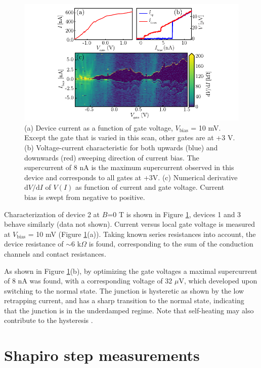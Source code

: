 \documentclass[english, aps,prb,showpacs,preprintnumber,amsmath,amssymb,superscriptaddress,reprint]{revtex4-1}
\begin{document}
\begin{figure}[!h]
\centering
\includegraphics[width=\textwidth]{figures/sup_fig1.pdf}
\caption{(a) Device current as a function of gate voltage, $V_\mathrm{bias}$ = 10 mV. Except the gate that is varied in this scan, other gates are at +3 V. (b) Voltage-current characteristic for both upwards (blue) and downwards (red) sweeping direction of current bias. The supercurrent of 8 nA is the maximum supercurrent observed in this device and corresponds to all gates at +3V. (c) Numerical derivative $\mathrm{d}V/\mathrm{d}I$ of $V\left(I\right)$ as function of current and gate voltage. Current bias is swept from negative to positive.}
\label{fig: charaterization_D1}
\end{figure}

Characterization of device 2 at $B$=0 T is shown in Figure \ref{fig: charaterization_D1}, devices 1 and 3 behave similarly (data not shown).
Current versus local gate voltage is measured at $V_{\text{bias}}$ = 10 mV (Figure \ref{fig: charaterization_D1}(a)). 
Taking known series resistances into account, the device resistance of $\sim$6 k$\Omega$ is found, corresponding to the sum of the conduction channels and contact resistances.

As shown in Figure \ref{fig: charaterization_D1}(b), by optimizing the gate voltages a maximal supercurrent of 8 nA was found, with a corresponding voltage of 32 $\mu$V, which developed upon switching to the normal state. 
The junction is hysteretic as shown by the low retrapping current, and has a sharp transition to the normal state, indicating that the junction is in the underdamped regime. 
Note that self-heating may also contribute to the hysteresis \cite{pekola2008hysteresis}. 


\section{Shapiro step measurements}
\end{document}
